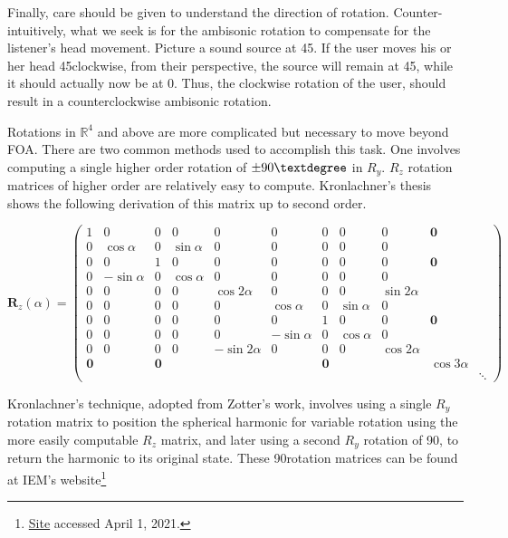 Finally, care should be given to understand the direction of rotation. Counter-intuitively, what we seek is for the ambisonic rotation to compensate for the listener's head movement. Picture a sound source at 45\textdegree. If the user moves his or her head 45\textdegree clockwise, from their perspective, the source will remain at 45\textdegree, while it should actually now be at 0\textdegree. Thus, the clockwise rotation of the user, should result in a counterclockwise ambisonic rotation. 

Rotations in $\mathbb{R}^{4}$ and above are more complicated but necessary to move beyond FOA. There are two common methods used to accomplish this task. One involves computing a single higher order rotation of $\pm90\textdegree$ in $R_{y}$. $R_{z}$ rotation matrices of higher order are relatively easy to compute. Kronlachner's thesis shows the following derivation of this matrix up to second order.

\begin{equation}
\boldsymbol{R}_z(\alpha)=\left(\begin{array}{c|ccc|ccccc|cc}
1 & 0 & 0 & 0 & 0 & 0 & 0 & 0 & 0 & \mathbf{0} & \\
\hline 0 & \cos \alpha & 0 & \sin \alpha & 0 & 0 & 0 & 0 & 0 & \\
0 & 0 & 1 & 0 & 0 & 0 & 0 & 0 & 0 & \mathbf{0} & \\
0 & -\sin \alpha & 0 & \cos \alpha & 0 & 0 & 0 & 0 & 0 & & \\
\hline 0 & 0 & 0 & 0 & \cos 2 \alpha & 0 & 0 & 0 & \sin 2 \alpha & & \\
0 & 0 & 0 & 0 & 0 & \cos \alpha & 0 & \sin \alpha & 0 & \\
0 & 0 & 0 & 0 & 0 & 0 & 1 & 0 & 0 & \mathbf{0} & \\
0 & 0 & 0 & 0 & 0 & -\sin \alpha & 0 & \cos \alpha & 0 & & \\
0 & 0 & 0 & 0 & -\sin 2 \alpha & 0 & 0 & 0 & \cos 2 \alpha & & \\
\hline \mathbf{0} & & \mathbf{0} & & & & \mathbf{0} & & & \cos 3 \alpha & \\
 & & & & & & & & & & \ddots
\end{array}\right)
\end{equation}

Kronlachner's technique, adopted from Zotter's work, involves using a single $R_{y}$ rotation matrix to position the spherical harmonic for variable rotation using the more easily computable $R_{z}$ matrix, and later using a second $R_{y}$ rotation of 90\textdegree, to return the harmonic to its original state. These 90\textdegree rotation matrices can be found at IEM's website\footnote{\href{https://ambisonics.iem.at/xchange/fileformat/docs/spherical-harmonics-rotation}{Site} accessed April 1, 2021.}

